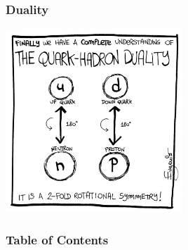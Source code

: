 \documentclass{beamer}
\begin{document}
\begin{frame}
  \frametitle{Duality}
  \centering
  \includegraphics[width=0.5\textwidth]{./images/quarkHadronDuality.eps}
\end{frame}

\begin{frame}
  \frametitle{Table of Contents}
  \tableofcontents
\end{frame} 
\end{document}
